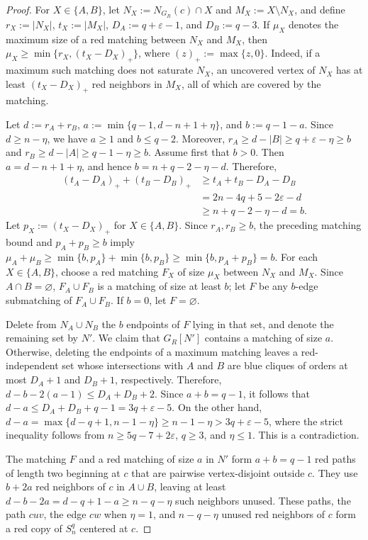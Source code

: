 \documentclass[10pt,a4paper]{amsart}
\begin{document}
\begin{proof}
For \(X\in\{A,B\}\), let \(N_X:=N_{G_R}(c)\cap X\) and
\(M_X:=X\setminus N_X\), and define \(r_X:=|N_X|\),
\(t_X:=|M_X|\), \(D_A:=q+\varepsilon-1\), and \(D_B:=q-3\).
If \(\mu_X\) denotes the maximum size of a red matching between
\(N_X\) and \(M_X\), then
\(\mu_X\geq\min\{r_X,(t_X-D_X)_+\}\),
where \((z)_+:=\max\{z,0\}\). Indeed, if a maximum such matching
does not saturate \(N_X\), an uncovered vertex of \(N_X\) has at
least \((t_X-D_X)_+\) red neighbors in \(M_X\), all of which are
covered by the matching.

Let \(d:=r_A+r_B\), \(a:=\min\{q-1,d-n+1+\eta\}\), and
\(b:=q-1-a\).
Since \(d\geq n-\eta\), we have \(a\geq1\) and \(b\leq q-2\).
Moreover,
\(r_A\geq d-|B|\geq q+\varepsilon-\eta\geq b\) and \(r_B\geq d-|A|\geq q-1-\eta\geq b\).
Assume first that \(b>0\). Then \(a=d-n+1+\eta\), and hence
\(b=n+q-2-\eta-d\).
Therefore,
\begin{align*}
 (t_A-D_A)_++(t_B-D_B)_+
 &\geq t_A+t_B-D_A-D_B\\
 &=2n-4q+5-2\varepsilon-d\\
 &\geq n+q-2-\eta-d=b.
\end{align*}
Let \(p_X:=(t_X-D_X)_+\) for \(X\in\{A,B\}\).
Since \(r_A,r_B\geq b\), the preceding matching bound and
\(p_A+p_B\geq b\) imply
\(\mu_A+\mu_B\geq \min\{b,p_A\}+\min\{b,p_B\} \geq \min\{b,p_A+p_B\}=b\).
For each \(X\in\{A,B\}\), choose a red matching \(F_X\) of size
\(\mu_X\) between \(N_X\) and \(M_X\). Since \(A\cap B=\varnothing\),
\(F_A\cup F_B\) is a matching of size at least \(b\); let \(F\) be
any \(b\)-edge submatching of \(F_A\cup F_B\). If \(b=0\), let
\(F=\varnothing\).

Delete from \(N_A\cup N_B\) the \(b\) endpoints of \(F\) lying in
that set, and denote the remaining set by \(N'\). We claim that
\(G_R[N']\) contains a matching of size \(a\). Otherwise, deleting
the endpoints of a maximum matching leaves a red-independent set
whose intersections with \(A\) and \(B\) are blue cliques of orders
at most \(D_A+1\) and \(D_B+1\), respectively. Therefore,
\(d-b-2(a-1)\leq D_A+D_B+2\).
Since \(a+b=q-1\), it follows that
\(d-a\leq D_A+D_B+q-1=3q+\varepsilon-5\).
On the other hand,
\(d-a =\max\{d-q+1,n-1-\eta\} \geq n-1-\eta >3q+\varepsilon-5\),
where the strict inequality follows from
\(n\geq5q-7+2\varepsilon\), \(q\geq3\), and \(\eta\leq1\).
This is a contradiction.

The matching \(F\) and a red matching of size \(a\) in \(N'\)
form \(a+b=q-1\) red paths of length two beginning at \(c\) that are
pairwise vertex-disjoint outside \(c\). They use \(b+2a\) red neighbors of \(c\) in
\(A\cup B\), leaving at least
\(d-b-2a=d-q+1-a\geq n-q-\eta\) such neighbors unused. These paths,
the path \(cuv\), the edge
\(cw\) when \(\eta=1\), and \(n-q-\eta\) unused red neighbors of
\(c\) form a red copy of \(S_n^q\) centered at \(c\).
\end{proof}
\end{document}
